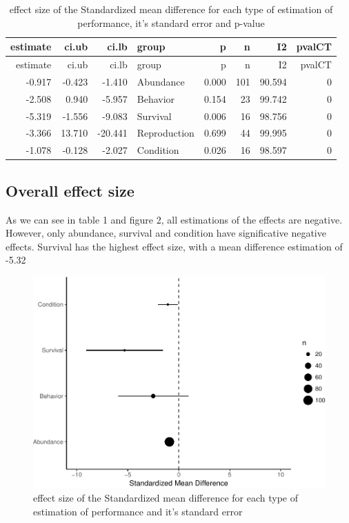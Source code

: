 \documentclass[]{elsarticle} %
\makeatletter
\def\maxwidth{\ifdim\Gin@nat@width>\linewidth\linewidth
\else\Gin@nat@width\fi}
\let\Oldincludegraphics\includegraphics
\renewcommand{\includegraphics}[1]{\Oldincludegraphics[width=\maxwidth]{#1}}
\makeatother
\begin{document}
\begin{longtable}[c]{@{}rrrlrrrr@{}}
\caption{effect size of the Standardized mean difference for each type
of estimation of performance, it's standard error and
p-value}\tabularnewline
\toprule
estimate & ci.ub & ci.lb & group & p & n & I2 & pvalCT\tabularnewline
\midrule
\endfirsthead
\toprule
estimate & ci.ub & ci.lb & group & p & n & I2 & pvalCT\tabularnewline
\midrule
\endhead
-0.917 & -0.423 & -1.410 & Abundance & 0.000 & 101 & 90.594 &
0\tabularnewline
-2.508 & 0.940 & -5.957 & Behavior & 0.154 & 23 & 99.742 &
0\tabularnewline
-5.319 & -1.556 & -9.083 & Survival & 0.006 & 16 & 98.756 &
0\tabularnewline
-3.366 & 13.710 & -20.441 & Reproduction & 0.699 & 44 & 99.995 &
0\tabularnewline
-1.078 & -0.128 & -2.027 & Condition & 0.026 & 16 & 98.597 &
0\tabularnewline
\bottomrule
\end{longtable}

\subsection{Overall effect size}\label{overall-effect-size}

As we can see in table 1 and figure 2, all estimations of the effects
are negative. However, only abundance, survival and condition have
significative negative effects. Survival has the highest effect size,
with a mean difference estimation of -5.32

\begin{figure}[htbp]
\centering
\includegraphics{MetanalysisNeonics_files/figure-latex/unnamed-chunk-4-1.pdf}
\caption{effect size of the Standardized mean difference for each type
of estimation of performance and it's standard error}
\end{figure}
\end{document}
